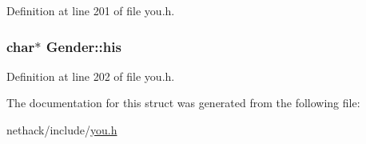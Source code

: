 Definition at line 201 of file you.\+h.

\hypertarget{structGender_a7176a9ad4710377dea0b8396d91a0a05}{
\subsubsection[{his}]{ char$\ast$ Gender\+::his}}\label{structGender_a7176a9ad4710377dea0b8396d91a0a05}


Definition at line 202 of file you.\+h.



The documentation for this struct was generated from the following file\+:\begin{DoxyCompactItemize}
\item 
nethack/include/\hyperlink{you_8h}{you.\+h}\end{DoxyCompactItemize}

